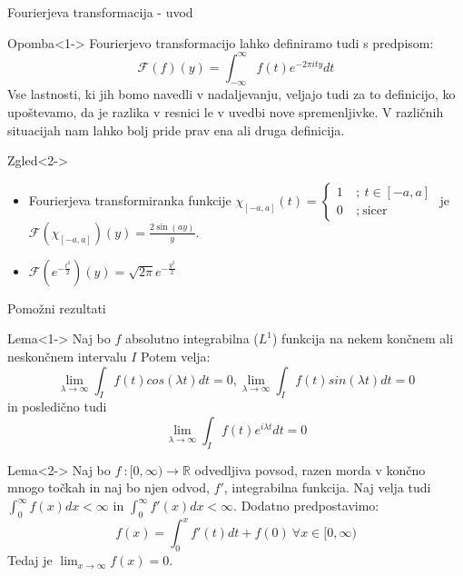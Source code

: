 \documentclass[t, 8pt]{beamer} %
\newcommand{\mth}[1]{\ensuremath{\mathbb{#1}}}
\newcommand{\R}{\mth{R}}
\newcommand{\map}[3]{\ensuremath{{#1}~: {#2} \rightarrow {#3}}}
\newcommand{\fillblack}[1]{
	\begin{tikzpicture}[remember picture, overlay]
		\node [shift={(0 cm,0cm)}]  at (current page.south west)
		{%
			\begin{tikzpicture}[remember picture, overlay] at (current page.south west)
				\draw [fill=black] (0, 0) -- (0,#1 \paperheight) --
				(\paperwidth,#1 \paperheight) -- (\paperwidth,0) -- cycle ;
			\end{tikzpicture}
		};
		\draw (current page.north west) rectangle (current page.south east);
	\end{tikzpicture}
}
\begin{document}
		\begin{frame}{Fourierjeva transformacija - uvod}
			\begin{block}{Opomba}<1->
				Fourierjevo transformacijo lahko definiramo tudi s predpisom: $$\mathcal{F}(f)(y) = \int_{-\infty}^{\infty}f(t)e^{-2\pi ity} dt$$ Vse lastnosti, ki jih bomo navedli v nadaljevanju, veljajo tudi za to definicijo, ko upoštevamo, da je razlika v resnici le v uvedbi nove spremenljivke. V različnih situacijah nam lahko bolj pride prav ena ali druga definicija.
			\end{block}
			\begin{block}{Zgled}<2->
				\begin{itemize}
					\item Fourierjeva transformiranka funkcije $\chi_{[-a, a]}(t) = \begin{cases}
						1~&;~ t\in [-a, a] \\
						0~&;~\text{sicer}
					\end{cases}$ je $\mathcal{F}(\chi_{[-a, a]})(y) = \frac{2\sin(ay)}{y}$.
					\item $\mathcal{F}(e^{-\frac{t^2}{2}})(y)=\sqrt{2\pi}e^{-\frac{y^2}{2}}$
				\end{itemize}
			\end{block}
		\end{frame}
		
		\begin{frame}{Pomožni rezultati}
			\begin{block}{Lema}<1->
				Naj bo $f$ absolutno integrabilna ($L^1$) funkcija na nekem končnem ali neskončnem intervalu $I$ Potem velja: $$\lim_{\lambda\to\infty}\int_I f(t)cos(\lambda t)dt = 0, \lim_{\lambda\to\infty}\int_I f(t)sin(\lambda t)dt = 0$$ in posledično tudi $$\lim_{\lambda\to\infty}\int_I f(t)e^{i\lambda t}dt = 0$$
			\end{block}
			\begin{block}{Lema}<2->
				Naj bo $\map{f}{[0, \infty)}{\R}$ odvedljiva povsod, razen morda v končno mnogo točkah in naj bo njen odvod, $f'$, integrabilna funkcija. Naj velja tudi $\int_0^\infty f(x)dx < \infty$ in $\int_0^\infty f'(x)dx < \infty$. Dodatno predpostavimo: $$f(x) = \int_{0}^{x} f'(t)dt + f(0) ~\forall x\in [0,\infty)$$ Tedaj je $\lim_{x\to\infty}f(x) = 0$.
			\end{block}
		\end{frame}
		
\end{document}
